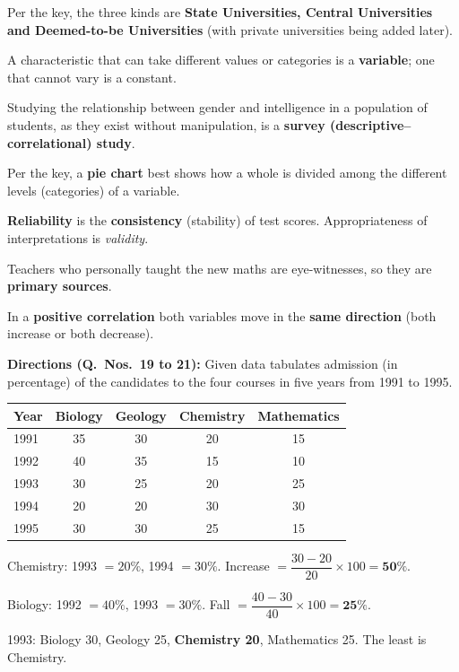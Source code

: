 Per the key, the three kinds are \textbf{State Universities, Central Universities and Deemed-to-be Universities} (with private universities being added later).

A characteristic that can take different values or categories is a \textbf{variable}; one that cannot vary is a constant.

Studying the relationship between gender and intelligence in a population of students, as they exist without manipulation, is a \textbf{survey (descriptive--correlational) study}.

Per the key, a \textbf{pie chart} best shows how a whole is divided among the different levels (categories) of a variable.

\textbf{Reliability} is the \textbf{consistency} (stability) of test scores. Appropriateness of interpretations is \emph{validity}.

Teachers who personally taught the new maths are eye-witnesses, so they are \textbf{primary sources}.

In a \textbf{positive correlation} both variables move in the \textbf{same direction} (both increase or both decrease).

\textbf{Directions (Q.~Nos.~19 to 21):} Given data tabulates admission (in percentage) of the candidates to the four courses in five years from 1991 to 1995.
\begin{center}\small
\begin{tabular}{lcccc}\toprule \textbf{Year} & \textbf{Biology} & \textbf{Geology} & \textbf{Chemistry} & \textbf{Mathematics}\\\midrule
1991 & 35 & 30 & 20 & 15\\ 1992 & 40 & 35 & 15 & 10\\ 1993 & 30 & 25 & 20 & 25\\ 1994 & 20 & 20 & 30 & 30\\ 1995 & 30 & 30 & 25 & 15\\\bottomrule
\end{tabular}
\end{center}

Chemistry: 1993 $=20\%$, 1994 $=30\%$. Increase $=\dfrac{30-20}{20}\times100=\mathbf{50\%}$.

Biology: 1992 $=40\%$, 1993 $=30\%$. Fall $=\dfrac{40-30}{40}\times100=\mathbf{25\%}$.

1993: Biology 30, Geology 25, \textbf{Chemistry 20}, Mathematics 25. The least is Chemistry.

